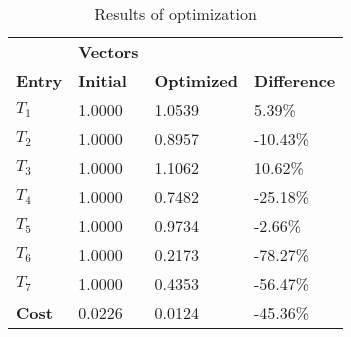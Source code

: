 \begin{table}[H]
\centering
\begin{tabular}{llll}
\textbf{}      & \cellcolor[HTML]{EFEFEF}\textbf{Vectors} & \textbf{} & \textbf{}         \\
\rowcolor[HTML]{EFEFEF} 
\textbf{Entry} & \textbf{Initial} & \textbf{Optimized} & \textbf{Difference} \\
$T_1$ & 1.0000 & 1.0539 & 5.39\% \\ 
$T_2$ & 1.0000 & 0.8957 & -10.43\% \\ 
$T_3$ & 1.0000 & 1.1062 & 10.62\% \\ 
$T_4$ & 1.0000 & 0.7482 & -25.18\% \\ 
$T_5$ & 1.0000 & 0.9734 & -2.66\% \\ 
$T_6$ & 1.0000 & 0.2173 & -78.27\% \\ 
$T_7$ & 1.0000 & 0.4353 & -56.47\% \\ 
\rowcolor[HTML]{EFEFEF} 
\textbf{Cost}  & 0.0226 & 0.0124 & -45.36\% \\ 
\end{tabular}
\caption{Results of optimization}
\label{tab:OptimizationAnalysis}
\end{table}